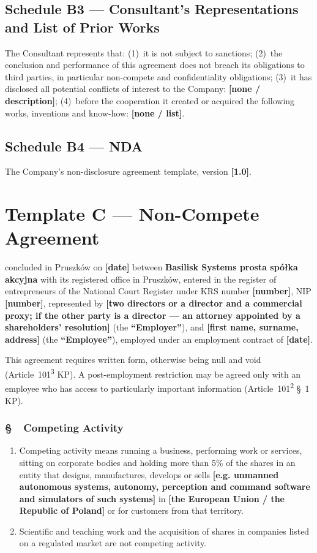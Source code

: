 \documentclass[11pt,a4paper]{report}
\newcounter{paragraf}
\newcommand{\paragraf}[1]{%
  \refstepcounter{paragraf}%
  \Needspace{5\baselineskip}%
  \subsection*{\S~\theparagraf\ #1}%
}
\newenvironment{ContractClause}[1]{\paragraf{#1}}{\par}
\newcommand{\field}[1]{\textbf{[#1]}}
\newcommand{\CompanyFull}{Basilisk Systems prosta spółka akcyjna}
\newcommand{\Strony}{\textbf{\CompanyFull{}} with its registered office in Pruszków, entered in the register of entrepreneurs of the National Court Register under KRS number \field{number}, NIP \field{number}, represented by \field{two directors or a director and a commercial proxy; if the other party is a director --- an attorney appointed by a shareholders' resolution}}
\begin{document}
\section*{Schedule B3 --- Consultant's Representations and List of Prior Works}
The Consultant represents that: (1)~it is not subject to sanctions; (2)~the conclusion and performance of this agreement does not breach its obligations to third parties, in particular non-compete and confidentiality obligations; (3)~it has disclosed all potential conflicts of interest to the Company: \field{none / description}; (4)~before the cooperation it created or acquired the following works, inventions and know-how: \field{none / list}.

\section*{Schedule B4 --- NDA}
The Company's non-disclosure agreement template, version \field{1.0}.

\chapter*{Template C --- Non-Compete Agreement}
\setcounter{paragraf}{0}

concluded in Pruszków on \field{date} between \Strony{} (the \textbf{``Employer''}), and \field{first name, surname, address} (the \textbf{``Employee''}), employed under an employment contract of \field{date}.

{\small This agreement requires written form, otherwise being null and void (Article~101\textsuperscript{3} KP). A post-employment restriction may be agreed only with an employee who has access to particularly important information (Article~101\textsuperscript{2} \S~1 KP).\par}

\begin{ContractClause}{Competing Activity}
\label{c:definicja}
\begin{enumerate}
  \item Competing activity means running a business, performing work or services, sitting on corporate bodies and holding more than 5\% of the shares in an entity that designs, manufactures, develops or sells \field{e.g. unmanned autonomous systems, autonomy, perception and command software and simulators of such systems} in \field{the European Union / the Republic of Poland} or for customers from that territory.
  \item Scientific and teaching work and the acquisition of shares in companies listed on a regulated market are not competing activity.
\end{enumerate}
\end{ContractClause}
\end{document}
